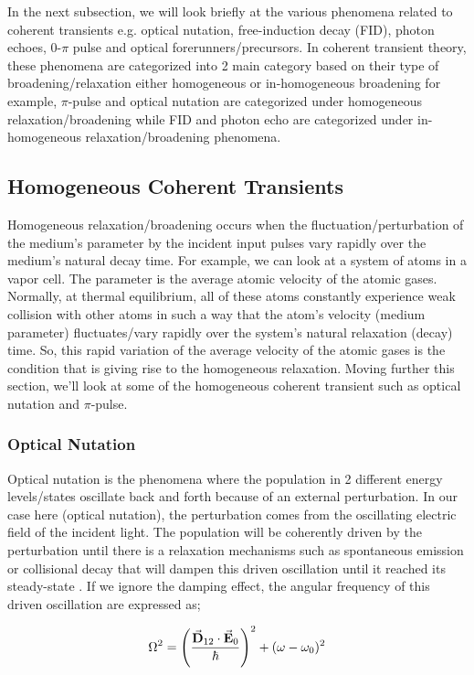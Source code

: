 In the next subsection, we will look briefly at the various phenomena related to coherent transients e.g. optical nutation, free-induction decay (FID), photon echoes, 0-$\pi$ pulse and optical forerunners/precursors. In coherent transient theory, these phenomena are categorized into 2 main category based on their type of broadening/relaxation either homogeneous or in-homogeneous broadening \cite{Meystre2006} for example, $\pi$-pulse and optical nutation are categorized under homogeneous relaxation/broadening while FID and photon echo are categorized under in-homogeneous relaxation/broadening phenomena. 

\subsection{Homogeneous Coherent Transients}
Homogeneous relaxation/broadening occurs when the fluctuation/perturbation of the medium's parameter by the incident input pulses vary rapidly over the medium's natural decay time. For example, we can look at a system of atoms in a vapor cell. The parameter is the average atomic velocity of the atomic gases. Normally, at thermal equilibrium, all of these atoms constantly experience weak collision with other atoms in such a way that the atom's velocity (medium parameter) fluctuates/vary rapidly over the system's natural relaxation (decay) time. So, this rapid variation of the average velocity of the atomic gases is the condition that is giving rise to the homogeneous relaxation. Moving further this section, we'll look at some of the homogeneous coherent transient such as optical nutation and $\pi$-pulse.

\subsubsection{Optical Nutation}
Optical nutation is the phenomena where the population in 2 different energy levels/states oscillate back and forth because of an external perturbation. In our case here (optical nutation), the perturbation comes from the oscillating electric field of the incident light. The population will be coherently driven by the perturbation until there is a relaxation mechanisms such as spontaneous emission or collisional decay that will dampen this driven oscillation until it reached its steady-state \cite{Foster1974}. If we ignore the damping effect, the angular frequency of this driven oscillation are expressed as;

\begin{equation}
    \Omega^{2} = \left(\frac{\va{D}_{12} \cdot \va{E}_{0}}{\hbar}\right)^{2} + (\omega - \omega_{0})^{2}
\end{equation}

